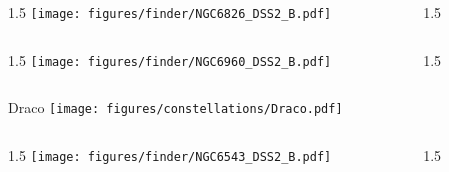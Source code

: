 \documentclass[final]{beamer}
\newlength{\colwidth}
\begin{document}

\begin{frame}[t]{}
  \begin{columns}[T]
    \begin{column}{1.5\colwidth}
      \centering
      \texttt{[image: figures/finder/NGC6826\_DSS2\_B.pdf]}
    \end{column}
    \begin{column}{1.5\colwidth}
      \Large
      
    \end{column}
  \end{columns}
  \vspace{\fill}
  \begin{columns}[T]
    \begin{column}{1.5\colwidth}
      \centering
      \texttt{[image: figures/finder/NGC6960\_DSS2\_B.pdf]}
    \end{column}
    \begin{column}{1.5\colwidth}
      \Large
      
    \end{column}
  \end{columns}
\end{frame}


\begin{frame}[t]{\LARGE Draco}
  \centering
  \texttt{[image: figures/constellations/Draco.pdf]}
\end{frame}


\begin{frame}[t]{}
  \begin{columns}[T]
    \begin{column}{1.5\colwidth}
      \centering
      \texttt{[image: figures/finder/NGC6543\_DSS2\_B.pdf]}
    \end{column}
    \begin{column}{1.5\colwidth}
      \Large
      
    \end{column}
  \end{columns}
  \vspace{\fill}
\end{frame}
\end{document}
